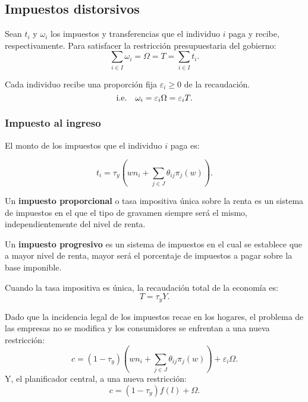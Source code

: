 \documentclass[8pt,a4paper]{extarticle}
\begin{document}
\begin{multicols}{3}
	\subsection{Impuestos distorsivos}

	\begin{boxprop}[]
		Sean $t_i$ y $\omega_i$ los impuestos y transferencias que el individuo $i$ paga y recibe, respectivamente. Para satisfacer la restricción presupuestaria del gobierno:
		\[
			\sum_{i \in I} \omega_i = \Omega = T = \sum_{i \in I} t_i
			.\]
	\end{boxprop}

	\begin{boxprop}[]
		Cada individuo recibe una proporción fija $\varepsilon_i \ge 0$ de la recaudación.
		\[
			\text{\normalfont i.e.} \quad \omega_i = \varepsilon_i\Omega = \varepsilon_i T
			.\]
	\end{boxprop}

	\subsubsection{Impuesto al ingreso}

	El monto de los impuestos que el individuo $i$ paga es:

	\[
		t_i = \tau_y \left( wn_i + \sum_{j \in J} \theta_{ij} \pi_j (w) \right)
		.\]

	\begin{boxdef}
		Un \textbf{impuesto proporcional} o tasa impositiva única sobre la renta es un sistema de impuestos en el que el tipo de gravamen siempre será el mismo, independientemente del nivel de renta.
	\end{boxdef}

	\begin{boxdef}
		Un \textbf{impuesto progresivo} es un sistema de impuestos en el cual se establece que a mayor nivel de renta, mayor será el porcentaje de impuestos a pagar sobre la base imponible.
	\end{boxdef}

	\begin{boxprop}[]
		Cuando la tasa impositiva es única, la recaudación total de la economía es:
		\[
			T = \tau_y Y
			.\]
	\end{boxprop}

	\begin{boxrmk}[]
		Dado que la incidencia legal de los impuestos recae en los hogares, el problema de las empresas no se modifica y los consumidores se enfrentan a una nueva restricción:
		\[
			c = (1 - \tau_y) \left( wn_i + \sum_{j \in J} \theta_{ij} \pi_j(w) \right) + \varepsilon_i\Omega
			.\]
		Y, el planificador central, a una nueva restricción:
		\[
			c = (1 - \tau_y) f(l) + \Omega
			.\]
	\end{boxrmk}


\end{multicols}
\end{document}
